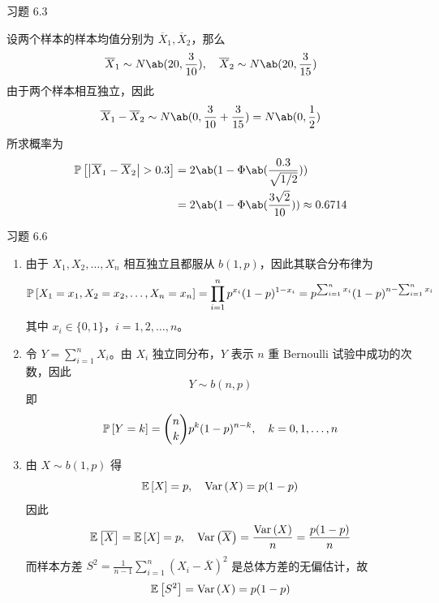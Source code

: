 \begin{problem}
    习题 6.3
    \begin{solution}
        设两个样本的样本均值分别为 $\overline{X}_1, \overline{X}_2$，那么
        $$
        \overline{X}_1 \sim N\ab(20, \frac{3}{10}), \quad \overline{X}_2 \sim N\ab(20, \frac{3}{15})
        $$
        由于两个样本相互独立，因此
        $$
        \overline{X}_1 - \overline{X}_2 \sim N\ab(0, \frac{3}{10} + \frac{3}{15}) = N\ab(0, \frac{1}{2})
        $$
        所求概率为
        $$
        \begin{aligned}
            \prob{\abs{\overline{X}_1 - \overline{X}_2} > 0.3} & = 2 \ab(1 - \Phi\ab(\frac{0.3}{\sqrt{1 / 2}})) \\
            & = 2 \ab(1 - \Phi\ab(\frac{3 \sqrt{2}}{10})) \approx 0.6714
        \end{aligned}
        $$
    \end{solution}
\end{problem}

\begin{problem}
    习题 6.6
    \begin{solution}
        \begin{enumerate}
            \item[\textbf{1)}] 由于 $X_1, X_2, \dots, X_n$ 相互独立且都服从 $b(1, p)$，因此其联合分布律为
            $$
            \operatorname{\mathbb{P}}\left[X_1 = x_1, X_2 = x_2, \dots, X_n = x_n\right] = \prod_{i = 1}^{n} p^{x_i} (1 - p)^{1 - x_i} = p^{\sum_{i = 1}^{n} x_i} (1 - p)^{n - \sum_{i = 1}^{n} x_i}
            $$
            其中 $x_i \in \{0, 1\}$，$i = 1, 2, \dots, n$。
            \item[\textbf{2)}] 令 $Y = \sum_{i = 1}^{n} X_i$。由 $X_i$ 独立同分布，$Y$ 表示 $n$ 重 Bernoulli 试验中成功的次数，因此
            $$
            Y \sim b(n, p)
            $$
            即
            $$
            \operatorname{\mathbb{P}}\left[Y = k\right] = \binom{n}{k} p^k (1 - p)^{n - k}, \quad k = 0, 1, \dots, n
            $$
            \item[\textbf{3)}] 由 $X \sim b(1, p)$ 得
            $$
            \operatorname{\mathbb{E}}\left[X\right] = p, \quad \operatorname{Var}\left(X\right) = p (1 - p)
            $$
            因此
            $$
            \operatorname{\mathbb{E}}\left[\overline{X}\right] = \operatorname{\mathbb{E}}\left[X\right] = p, \quad \operatorname{Var}\left(\overline{X}\right) = \frac{\operatorname{Var}\left(X\right)}{n} = \frac{p (1 - p)}{n}
            $$
            而样本方差 $S^2 = \frac{1}{n - 1} \sum_{i = 1}^{n} (X_i - \overline{X})^2$ 是总体方差的无偏估计，故
            $$
            \operatorname{\mathbb{E}}\left[S^2\right] = \operatorname{Var}\left(X\right) = p (1 - p)
            $$
        \end{enumerate}
    \end{solution}
\end{problem}

